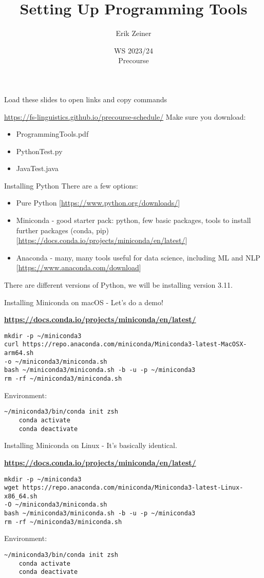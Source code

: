 \documentclass[aspectratio=169,hyperref={unicode}]{beamer}
\title{Setting Up Programming Tools}
\author{Erik Zeiner}
\institute{Fachschaft General \& Computational Linguistics\\ \textbf{University of Tübingen}}
\date{WS 2023/24 \\ Precourse}
\begin{document}
\frame{\titlepage}
\begin{frame}{Load these slides to open links and copy commands}

	\centering \Large \url{https://fs-linguistics.github.io/precourse-schedule/}
	\vfill
	\large
	Make sure you download:
	\begin{itemize}
		\item ProgrammingTools.pdf
		\item PythonTest.py
		\item JavaTest.java
	\end{itemize}
\end{frame}

\begin{frame}{Installing Python}
There are a few options:
\begin{itemize}
	\item Pure Python [\url{https://www.python.org/downloads/}]
	\item Miniconda - good starter pack: python, few basic packages, tools to install further packages (conda, pip) [\url{https://docs.conda.io/projects/miniconda/en/latest/}]
	\item Anaconda - many, many tools useful for data science, including ML and NLP [\url{https://www.anaconda.com/download}]
\end{itemize}
There are different versions of Python, we will be installing version 3.11.
\end{frame}

\begin{frame}[fragile]{Installing Miniconda on macOS - Let's do a demo!}
\begin{center}
	\textbf{\url{https://docs.conda.io/projects/miniconda/en/latest/}}
\end{center}
\begin{verbatim}
mkdir -p ~/miniconda3
curl https://repo.anaconda.com/miniconda/Miniconda3-latest-MacOSX-arm64.sh 
-o ~/miniconda3/miniconda.sh
bash ~/miniconda3/miniconda.sh -b -u -p ~/miniconda3
rm -rf ~/miniconda3/miniconda.sh
\end{verbatim}
Environment: \begin{verbatim}
~/miniconda3/bin/conda init zsh
	conda activate
	conda deactivate
\end{verbatim}
\end{frame}

\begin{frame}[fragile]{Installing Miniconda on Linux - It's basically identical.}
\begin{center}
	\textbf{\url{https://docs.conda.io/projects/miniconda/en/latest/}}
\end{center}
\begin{verbatim}
mkdir -p ~/miniconda3
wget https://repo.anaconda.com/miniconda/Miniconda3-latest-Linux-x86_64.sh 
-O ~/miniconda3/miniconda.sh
bash ~/miniconda3/miniconda.sh -b -u -p ~/miniconda3
rm -rf ~/miniconda3/miniconda.sh
\end{verbatim}
Environment: \begin{verbatim}
~/miniconda3/bin/conda init zsh
	conda activate
	conda deactivate
\end{verbatim}
\end{frame}
\end{document}
